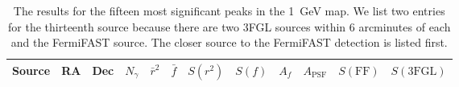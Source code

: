\documentclass[useAMS,usenatbib]{mn2e}
\begin{document}
\begin{table}
  \caption{The results for the fifteen most significant peaks in the
    1~GeV map.  We list two entries for the thirteenth source because
    there are two 3FGL sources within 6 arcminutes of each and the
    FermiFAST source.  The closer source to the FermiFAST detection is
    listed first.}
  \label{tab:topten}
  \begin{tabular}{lrrrrrrrrrrr}
    \hline
     Source & \multicolumn{1}{c}{RA} & \multicolumn{1}{c}{Dec}  & \multicolumn{1}{c}{$N_\gamma$}  &\multicolumn{1}{c}{$\bar r^2$} & \multicolumn{1}{c}{$\bar f$} & \multicolumn{1}{c}{$S(r^2)$} & \multicolumn{1}{c}{$S(f)$} & \multicolumn{1}{c}{$A_f$}  & \multicolumn{1}{c}{$A_\mathrm{PSF}$} & \multicolumn{1}{c}{$S(\mathrm{FF})$} & \multicolumn{1}{c}{$S(\mathrm{3FGL})$} \\
    \hline


\end{tabular}
\end{table}
\end{document}
